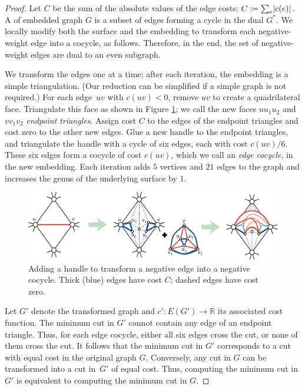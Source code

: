 \documentclass[letterpaper,review]{siamart190516}
\def\Real{\mathbb{R}}
\begin{document}
{\begin{proof}
Let $C$ be the sum of the absolute values of the edge costs: $C:= \sum_e \mathopen| c(e) \mathclose|$.
A  of embedded graph $G$ is a subset of edges forming a cycle in the dual $G^*$.
We locally modify both the surface and the embedding to transform each negative-weight edge into a cocycle, as follows.  Therefore, in the end, the set of negative-weight edges are dual to an even subgraph.

We transform the edges one at a time; after each iteration, the embedding is a simple triangulation.  (Our reduction can be simplified if a simple graph is not required.)  For each edge~$uv$ with $c(uv)<0$, remove $uv$ to create a quadrilateral face.  Triangulate this face as shown in Figure \ref{fig:addhandle}; we call the new faces $uu_1u_2$ and $vv_1v_2$ \emph{endpoint triangles}.  Assign cost $C$ to the edges of the endpoint triangles and cost zero to the other new edges. Glue a new handle to the endpoint triangles, and triangulate the handle with a cycle of six edges, each with cost $c(uv)/6$.  These six edges form a cocycle of cost $c(uv)$, which we call an \emph{edge cocycle}, in the new embedding.  Each iteration adds $5$ vertices and $21$ edges to the graph and increases the genus of the underlying surface by $1$.

\begin{figure}[hbt]
\centering\includegraphics[scale=0.4]{Fig/addhandle3}
\caption{Adding a handle to transform a negative edge into a negative cocycle.  Thick (blue) edges have cost $C$; dashed edges have cost zero.}
\label{fig:addhandle}
\end{figure}

Let $G'$ denote the transformed graph and $c'\colon E(G')\to \Real$ its associated cost function.  The minimum cut in $G'$ cannot contain any edge of an endpoint triangle.  Thus, for each edge cocycle, either all six edges cross the cut, or none of them cross the cut.  It follows that the minimum cut in $G'$ corresponds to a cut with equal cost in the original graph $G$.  Conversely, any cut in $G$ can be transformed into a cut in~$G'$ of equal cost.  Thus, computing the minimum cut in $G'$ is equivalent to computing the minimum cut in $G$.
\end{proof}
\color{black}

}
\end{document}
